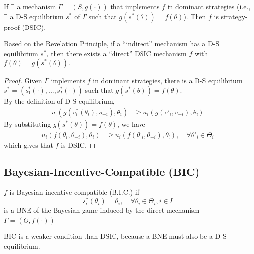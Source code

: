 \documentclass[11pt]{elegantbook}
\begin{document}
\begin{theorem}
    If $\exists$ a mechanism $\Gamma=(S,g(\cdot))$ that implements $f$ in dominant strategies (i.e., $\exists$ a D-S equilibrium $s^*$ of $\Gamma$ such that $g(s^*(\theta))=f(\theta)$). Then $f$ is strategy-proof (DSIC).
    \begin{note}
        Based on the Revelation Principle, if a ``indirect'' mechanism has a D-S equilibrium $s^*$, then there exists a ``direct'' DSIC mechanism $f$ with $f(\theta)=g(s^*(\theta))$.
    \end{note}
\end{theorem}
\begin{proof}
    Given $\Gamma$ implements $f$ in dominant strategies, there is a  D-S equilibrium $s^*=\left(s_1^*(\cdot),...,s_I^*(\cdot)\right)$ such that $g(s^*(\theta))=f(\theta)$.\\
    By the definition of D-S equilibrium,
    \begin{equation}
        \begin{aligned}
            u_i(g(s_i^*(\theta_i),s_{-i}),\theta_i)&\geq u_i(g(s'_i,s_{-i}),\theta_i)
        \end{aligned}
        \nonumber
    \end{equation}
    By substituting $g(s^*(\theta))=f(\theta)$, we have
    \begin{equation}
        \begin{aligned}
            u_i(f(\theta_i,\theta_{-i}),\theta_i)&\geq u_i(f(\theta'_i,\theta_{-i}),\theta_i),\quad \forall \theta'_i\in\Theta_i
        \end{aligned}
        \nonumber
    \end{equation}
    which gives that $f$ is DSIC.
\end{proof}



\subsection{Bayesian-Incentive-Compatible (BIC)}
\begin{definition}[BIC]
    \normalfont
    $f$ is Bayesian-incentive-compatible (B.I.C.) if $$s^*_i(\theta_i)=\theta_i,\quad \forall \theta_i\in\Theta_i,i\in I$$ is a BNE of the Bayesian game induced by the direct mechanism $\Gamma=(\Theta,f(\cdot))$.
\end{definition}
BIC is a weaker condition than DSIC, because a BNE must also be a D-S equilibrium.
\end{document}
